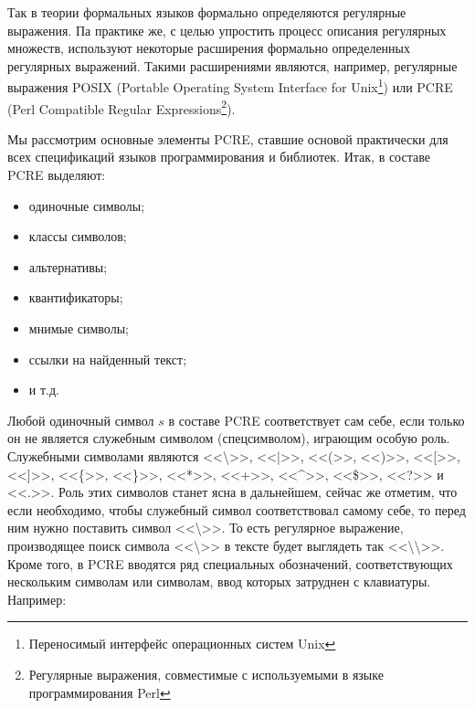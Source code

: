 Так в теории формальных языков формально определяются регулярные выражения. Па практике же, с целью упростить процесс описания регулярных множеств, используют некоторые расширения формально определенных регулярных выражений. Такими расширениями являются, например, регулярные выражения POSIX (Portable Operating System Interface for Unix\footnote{Переносимый интерфейс операционных систем Unix}) или PCRE (Perl Compatible Regular Expressions\footnote{Регулярные выражения, совместимые с используемыми в языке программирования Perl}). 

Мы рассмотрим основные элементы PCRE, ставшие основой практически для всех спецификаций языков программирования и библиотек. Итак, в составе PCRE выделяют:
\begin{itemize}
    \item одиночные символы; 
    \item классы символов; 
    \item альтернативы; 
    \item квантификаторы; 
    \item мнимые символы; 
    \item ссылки на найденный текст;
    \item и т.д.
\end{itemize}

Любой одиночный символ $s$ в составе PCRE соответствует сам себе, если только он не является служебным символом (спецсимволом), играющим особую роль. Служебными символами являются <<\textbackslash>>, <<|>>, <<(>>, <<)>>, <<[>>, <<]>>, <<\{>>, <<\}>>, <<*>>, <<+>>, <<\^{}>>, <<\$>>, <<?>> и <<.>>. Роль этих символов станет ясна в дальнейшем, сейчас же отметим, что если необходимо, чтобы служебный символ соответствовал самому себе, то перед ним нужно поставить символ <<\textbackslash>>. То есть регулярное выражение, производящее поиск символа <<\textbackslash>> в тексте будет выглядеть так <<\textbackslash\textbackslash>>. Кроме того, в PCRE вводятся ряд специальных обозначений, соответствующих нескольким символам или символам, ввод которых затруднен с клавиатуры. Например:


